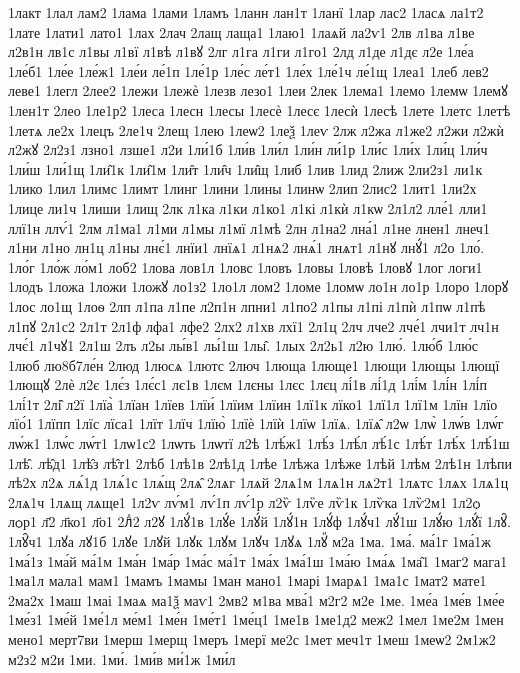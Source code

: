 {1лакт
1лал
лам2
1лама
1лами
1ламъ
1ланн
лан1т
1ланї
1лар
лас2
1ласѧ
ла1т2
1лате
1лати1
лато1
1лах
2лач
2лащ
лаща1
1лаю1
1лаѧй
ла2ѵ1
2лв
л1ва
л1ве
л2в1н
лв1с
л1вы
л1вї
л1вѣ
л1вꙋ
2лг
л1га
л1ги
л1го1
2лд
л1де
л1дє
л2е
1ле́а
1ле́б1
1ле́е
1ле́ж1
1ле́и
ле́1п
1ле́1р
1ле́с
ле́т1
1ле́х
1ле́1ч
ле́1щ
1леа1
1леб
лев2
леве1
1легл
2лее2
1лежи
1лежѐ
1лезв
лезо1
1леи
2лек
1лема1
1лемо
1лемѡ
1лемꙋ
1лен1т
2лео
1ле1р2
1леса
1лесн
1лесы
1лесѐ
1лесє
1лесѝ
1лесѣ
1лете
1летс
1летѣ
1летѧ
ле2х
1лецъ
2ле1ч
2лещ
1лею
1леѡ2
1леѯ
1леѵ
2лж
л2жа
л1же2
л2жи
л2жѝ
л2жꙋ
2л2з1
лзно1
лзше1
л2и
1ли́1б
1ли́в
1ли́л
1ли́н
ли́1р
1ли́с
1ли́х
1ли́ц
1ли́ч
1ли́ш
1ли́1щ
1ли̑1к
1ли̑1м
1ли̑т
1ли̑ч
1ли̑щ
1либ
1лив
1лид
2лиж
2ли2з1
ли1к
1лико
1лил
1лимс
1лимт
1линг
1лини
1лины
1линѡ
2лип
2лис2
1лит1
1ли2х
1лице
ли1ч
1лиши
1лищ
2лк
л1ка
л1ки
л1ко1
л1кі
л1кѝ
л1кѡ
2л1л2
лле́1
лли1
ллї1н
ллѵ́1
2лм
л1ма1
л1ми
л1мы
л1мї
л1мѣ
2лн
л1на2
лна́1
л1не
лнен1
лнеч1
л1ни
л1но
лн1ц
л1ны
лнє́1
лнїи1
лнїѧ1
л1нѧ2
лнѧ́1
лнѧт1
л1нꙋ
лнꙋ́1
л2о
1ло́.
1ло́г
1ло́ж
ло́м1
лоб2
1лова
лов1л
1ловс
1ловъ
1ловы
1ловѣ
1ловꙋ
1лог
логи1
1лодъ
1ложа
1ложи
1ложꙋ
ло1з2
1ло1л
лом2
1ломе
1ломѡ
ло1н
ло1р
1лоро
1лорꙋ
1лос
ло1щ
1лоѳ
2лп
л1па
л1пе
л2п1н
лпни1
л1по2
л1пы
л1пі
л1пѝ
л1пѡ
л1пѣ
л1пꙋ
2л1с2
2л1т
2л1ф
лфа1
лфе2
2лх2
л1хв
лхї1
2л1ц
2лч
лче2
лче́1
лчи1т
лч1н
лчє́1
л1чꙋ1
2л1ш
2лъ
л2ы
лы́в1
лы́1ш
1лы̑.
1лых
2л2ь1
л2ю
1лю́.
1лю́б
1лю́с
1люб
лю8б7ле́н
2люд
1люсѧ
1лютс
2люч
1люща
1люще1
1лющи
1лющы
1лющї
1лющꙋ
2лѐ
л2є
1лє́з
1лє́с1
лє1в
1лєм
1лєны
1лєс
1лєц
лі́1в
лі́1д
1лі́м
1лі́н
1лі́п
1лі́1т
2лі̑
л2ї
1лїа̀
1лїан
1лїев
1лїи́
1лїим
1лїин
1лї1к
лїко1
1лї1л
1лї1м
1лїн
1лїо
лїо́1
1лїпп
1лїс
лїса1
1лїт
1лїч
1лїю̀
1лїѐ
1лїѝ
1лїѡ
1лїѧ.
1лїѧ̑
л2ѡ
1лѡ̀
1лѡ́в
1лѡ́г
лѡ́ж1
1лѡ́с
лѡ́т1
1лѡ1с2
1лѡть
1лѡтї
л2ѣ
1лѣ́ж1
1лѣ́з
1лѣ́л
лѣ́1с
1лѣ́т
1лѣ́х
1лѣ́1ш
1лѣ̑.
лѣ̑д1
1лѣ̑з
лѣ̑т1
2лѣб
1лѣ1в
2лѣ1д
1лѣе
1лѣжа
1лѣже
1лѣй
1лѣм
2лѣ1н
1лѣпи
лѣ2х
л2ѧ
лѧ́1д
1лѧ́1с
1лѧ́щ
2лѧ̑
2лѧг
1лѧй
2лѧ1м
1лѧ1н
лѧ2т1
1лѧтс
1лѧх
1лѧ1ц
2лѧ1ч
1лѧщ
лѧще1
1л2ѵ
лѵ́м1
лѵ́1п
лѵ́1р
л2ѷ
1лѷе
лѷ1к
1лѷка
1лѷ2м1
1л2ѻ
лѻр1
л҃2
л҃ко1
л҃о1
2лⷣ2
л2ꙋ
1лꙋ́1в
1лꙋ́е
1лꙋ́й
1лꙋ́1н
1лꙋ́ф
1лꙋ́ч1
лꙋ́1ш
1лꙋ́ю
1лꙋ́ї
1лꙋ̑.
1лꙋ̑ч1
1лꙋа
лꙋ1б
1лꙋе
1лꙋй
1лꙋк
1лꙋм
1лꙋч
1лꙋѧ
1лꙋⷩ
м2а
1ма.
1ма́.
ма́1г
1ма́1ж
1ма́1з
1ма́й
ма́1м
1ма́н
1ма́р
1ма́с
ма́1т
1ма́х
1ма́1ш
1ма́ю
1ма́ѧ
1ма̑1
1маг2
мага1
1ма1л
мала1
мам1
1мамъ
1мамы
1ман
мано1
1марі
1марѧ1
1ма1с
1мат2
мате1
2ма2х
1маш
1маі
1маѧ
ма1ѯ
маѵ1
2мв2
м1ва
мва́1
м2г2
м2е
1ме.
1ме́а
1ме́в
1ме́е
1ме́з1
1ме́й
1ме́1л
ме́м1
1ме́н
1ме́т1
1ме́ц1
1ме1в
1ме1д2
меж2
1мел
1ме2м
1мен
мено1
мерт7ви
1мерш
1мерщ
1меръ
1мерї
ме2с
1мет
меч1т
1меш
1меѡ2
2м1ж2
м2з2
м2и
1ми.
1ми́.
1ми́в
ми́1ж
1ми́л
}
